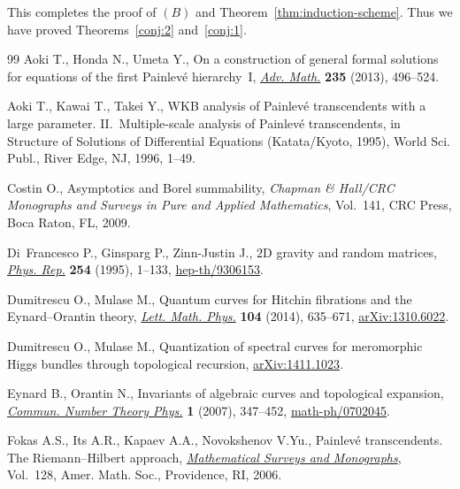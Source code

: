\documentclass[11pt]{article}
\theoremstyle{definition}
\numberwithin{equation}{section}
\begin{document}
This completes the proof of $(B)$ and Theorem~\ref{thm:induction-scheme}.
Thus we have proved Theorems~\ref{conj:2} and~\ref{conj:1}.
\begin{thebibliography}{99}
Aoki T., Honda N., Umeta Y., On a construction of general formal solutions for
  equations of the f\/irst {P}ainlev\'e hierarchy~{I}, \href{http://dx.doi.org/10.1016/j.aim.2012.12.011}{\textit{Adv. Math.}}
  \textbf{235} (2013), 496--524.

Aoki T., Kawai T., Takei Y., W{KB} analysis of {P}ainlev\'e transcendents with
  a large parameter. {II}.~{M}ultiple-scale analysis of {P}ainlev\'e
  transcendents, in Structure of Solutions of Dif\/ferential Equations
  ({K}atata/{K}yoto, 1995), World Sci. Publ., River Edge, NJ, 1996, 1--49.

Costin O., Asymptotics and {B}orel summability, \textit{Chapman {\rm \&} Hall/CRC
  Monographs and Surveys in Pure and Applied Mathematics}, Vol.~141, CRC Press,
  Boca Raton, FL, 2009.

Di~Francesco P., Ginsparg P., Zinn-Justin J., {$2$}{D} gravity and random
  matrices, \href{http://dx.doi.org/10.1016/0370-1573(94)00084-G}{\textit{Phys. Rep.}} \textbf{254} (1995), 1--133,
  \href{http://arxiv.org/abs/hep-th/9306153}{hep-th/9306153}.

Dumitrescu O., Mulase M., Quantum curves for {H}itchin f\/ibrations and the
  {E}ynard--{O}rantin theory, \href{http://dx.doi.org/10.1007/s11005-014-0679-0}{\textit{Lett. Math. Phys.}} \textbf{104} (2014),
  635--671, \href{http://arxiv.org/abs/1310.6022}{arXiv:1310.6022}.

Dumitrescu O., Mulase M., Quantization of spectral curves for meromorphic
  {H}iggs bundles through topological recursion, \href{http://arxiv.org/abs/1411.1023}{arXiv:1411.1023}.

Eynard B., Orantin N., Invariants of algebraic curves and topological
  expansion, \href{http://dx.doi.org/10.4310/CNTP.2007.v1.n2.a4}{\textit{Commun. Number Theory Phys.}} \textbf{1} (2007), 347--452,
  \href{http://arxiv.org/abs/math-ph/0702045}{math-ph/0702045}.

Fokas A.S., Its A.R., Kapaev A.A., Novokshenov V.Yu., Painlev\'e transcendents.
  The {R}iemann--{H}ilbert approach, \href{http://dx.doi.org/10.1090/surv/128}{\textit{Mathematical Surveys and
  Monographs}}, Vol.~128, Amer. Math. Soc., Providence, RI, 2006.


\end{thebibliography}
\end{document}

